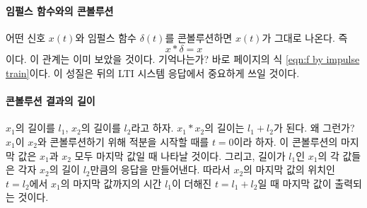 \paragraph{임펄스 함수와의 콘볼루션}
어떤 신호 $x(t)$와 임펄스 함수 $\delta(t)$를 콘볼루션하면 $x(t)$가 그대로 나온다. 즉
\begin{equation}
    x*\delta=x
\end{equation}
이다. 이 관계는 이미 보았을 것이다. 기억나는가? 바로 \pageref{eqn:f by impulse train} 페이지의 식 \ref{eqn:f by impulse train}이다.
이 성질은 뒤의 LTI 시스템 응답에서 중요하게 쓰일 것이다.
\paragraph{콘볼루션 결과의 길이}
$x_1$의 길이를 $l_1$, $x_2$의 길이를 $l_2$라고 하자. $x_1*x_2$의 길이는 $l_1+l_2$가 된다.
왜 그런가? $x_1$이 $x_2$와 콘볼루션하기 위해 적분을 시작할 때를 $t=0$이라 하자. 이 콘볼루션의 마지막 값은 $x_1$과 $x_2$ 모두 마지막 값일 때 나타날 것이다.
그리고, 길이가 $l_1$인 $x_1$의 각 값들은 각자 $x_2$의 길이 $l_2$만큼의 응답을 만들어낸다.
따라서 $x_2$의 마지막 값의 위치인 $t=l_2$에서 $x_1$의 마지막 값까지의 시간 $l_1$이 더해진 $t=l_1+l_2$일 때 마지막 값이 출력되는 것이다.
